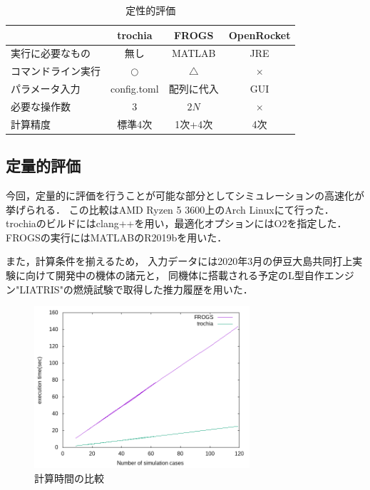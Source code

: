 \documentclass[a4j,10pt]{jsarticle}
\begin{document}
\begin{table}[htbp]
  \begin{tabular}{|l|c|c|c|} \hline
         & trochia & FROGS & OpenRocket \\ \hline
	実行に必要なもの & 無し & MATLAB & JRE \\
    コマンドライン実行 & $\bigcirc$ & $\bigtriangleup$ & $\times$ \\
    パラメータ入力 & config.toml & 配列に代入 & GUI \\
	必要な操作数 & $3$ & $2N$ & $\times$ \\
	計算精度 & 標準4次 & 1次+4次 & 4次 \\ \hline
  \end{tabular}
  \caption{定性的評価}
\end{table}

\subsection{定量的評価}

今回，定量的に評価を行うことが可能な部分としてシミュレーションの高速化が挙げられる．
この比較はAMD Ryzen 5 3600上のArch Linuxにて行った．
trochiaのビルドにはclang++を用い，最適化オプションにはO2を指定した．
FROGSの実行にはMATLABのR2019bを用いた．

また，計算条件を揃えるため，
入力データには2020年3月の伊豆大島共同打上実験に向けて開発中の機体の諸元と，
同機体に搭載される予定のL型自作エンジン"LIATRIS"の燃焼試験で取得した推力履歴を用いた．

\begin{figure}[htbp]
	\begin{center}
		\includegraphics[width=8cm]{./sim-time.png}
		\caption{計算時間の比較}
		\label{sim-time}
	\end{center}
\end{figure}
\end{document}
